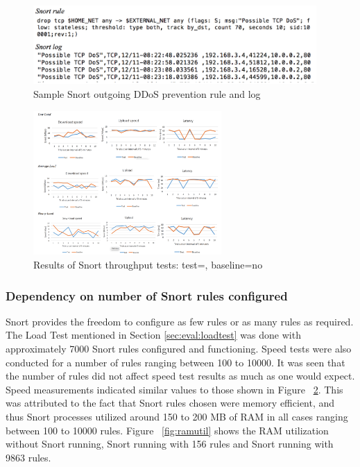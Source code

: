 \begin{figure}
	\centering
	\includegraphics[width=0.95\linewidth, height=3cm]{figs/ddosrule.png}
	\caption{Sample Snort outgoing DDoS prevention rule and log}
	\label{fig:snortrule1}
\end{figure}

\begin{figure}
	\centering
	\includegraphics[width=0.75\linewidth, height=5.5cm]{figs/graph.png}
	\caption{Results of Snort throughput tests: test=\sysname, baseline=no \sysname}
	\label{fig:graph}
\end{figure}

\subsubsection{Dependency on number of Snort rules configured}
Snort provides the freedom to configure as few rules or as many rules as required. The Load Test mentioned in Section \ref{sec:eval:loadtest} was done with approximately 7000 Snort rules configured and functioning. Speed tests were also conducted for a number of rules ranging between 100 to 10000. It was seen that the number of rules did not affect speed test results as much as one would expect. Speed measurements indicated similar values to those shown in Figure ~\ref{fig:graph}. This was attributed to the fact that Snort rules chosen were memory efficient, and thus Snort processes utilized around 150 to 200 MB of RAM in all cases ranging between 100 to 10000 rules. Figure ~\ref{fig:ramutil} shows the RAM utilization without Snort running, Snort running with 156 rules and Snort running with 9863 rules. \\


